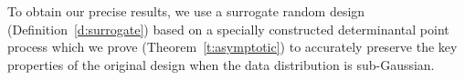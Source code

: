\documentclass[11pt]{article}
\begin{document}
To obtain our precise results, we use a %
surrogate random design (Definition~\ref{d:surrogate}) based on a specially
constructed determinantal point process \citep{dpps-in-randnla,dpp-ml} which we prove
(Theorem~\ref{t:asymptotic}) to accurately preserve the key properties of the
original design when the data distribution is sub-Gaussian.

\end{document}
